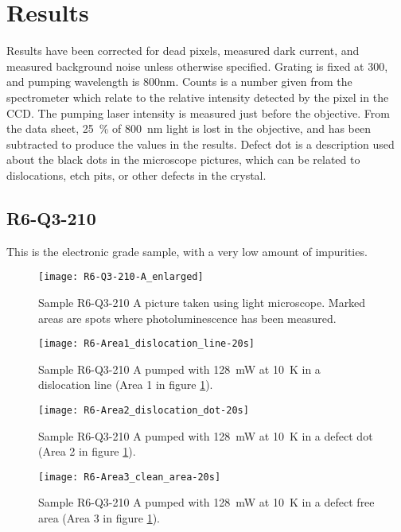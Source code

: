 \section{Results}

Results have been corrected for dead pixels, measured dark current, and measured background noise unless otherwise specified. Grating is fixed at 300, and pumping wavelength is 800nm. Counts is a number given from the spectrometer which relate to the relative intensity detected by the pixel in the CCD. The pumping laser intensity is measured just before the objective. From the data sheet, 25~\% of 800~nm light is lost in the objective, and has been subtracted to produce the values in the results. Defect dot is a description used about the black dots in the microscope pictures, which can be related to dislocations, etch pits, or other defects in the crystal.

\subsection{R6-Q3-210}

This is the electronic grade sample, with a very low amount of impurities.

\begin{figure}[H]
\centering
\texttt{[image: R6-Q3-210-A\_enlarged]}
\caption[R6-Q3-210 A from light microscope]{Sample R6-Q3-210 A picture taken using light microscope. Marked areas are spots where photoluminescence has been measured.}
\label{fig:R6-Q3-210-A_enlarged}%
\end{figure}


\begin{figure}[H]
\centering
\texttt{[image: R6-Area1\_dislocation\_line-20s]}
\caption[R6-Q3-210 at a dislocation line]{Sample R6-Q3-210 A pumped with 128~mW at 10~K in a dislocation line (Area 1 in figure \ref{fig:R6-Q3-210-A_enlarged}).}
\label{fig:R6-Area1_dislocation_line-20s}%
\end{figure}


\begin{figure}[H]
\centering
\texttt{[image: R6-Area2\_dislocation\_dot-20s]}
\caption[R6-Q3-210 at a defect dot]{Sample R6-Q3-210 A pumped with 128~mW at 10~K in a defect dot (Area 2 in figure \ref{fig:R6-Q3-210-A_enlarged}).}
\label{fig:R6-Area2_dislocation_dot-20s}%
\end{figure}


\begin{figure}[H]
\centering
\texttt{[image: R6-Area3\_clean\_area-20s]}
\caption[R6-Q3-210 at a defect free area]{Sample R6-Q3-210 A pumped with 128~mW at 10~K in a defect free area (Area 3 in figure \ref{fig:R6-Q3-210-A_enlarged}).}
\label{fig:R6-Area3_clean_area-20s}%
\end{figure}


